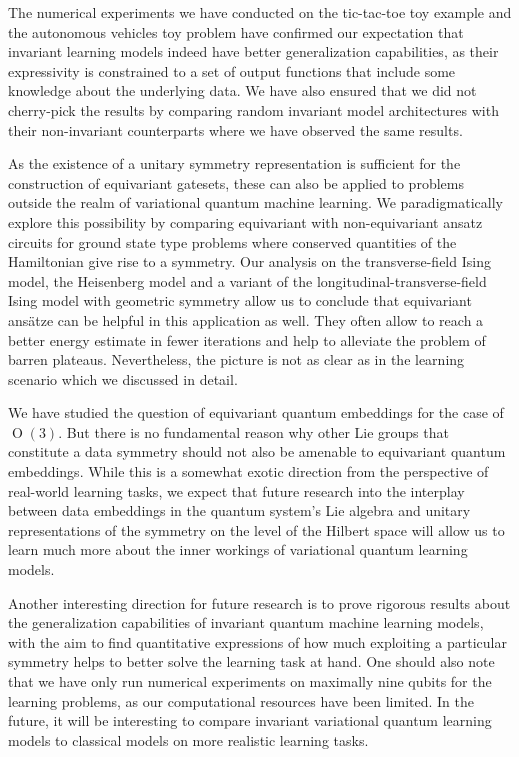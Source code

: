 \documentclass[a4paper,twocolumn,notitlepage,nofootinbib,superscriptaddress,floatfix]{revtex4-2}
\renewcommand{\O}{\ensuremath{\operatorname{O}}}
\begin{document}
The numerical experiments we have conducted on the tic-tac-toe toy example and the autonomous vehicles toy problem have confirmed our expectation that invariant learning models indeed have better generalization capabilities, as their expressivity is constrained to a set of output functions that include some knowledge about the underlying data. We have also ensured that we did not cherry-pick the results by comparing random invariant model architectures with their non-invariant counterparts where we have observed the same results.

As the existence of a unitary symmetry representation is sufficient for the construction of equivariant gatesets, these can also be applied to problems outside the realm of variational quantum machine learning. We paradigmatically explore this possibility by comparing equivariant with non-equivariant ansatz circuits for ground state type problems where conserved quantities of the Hamiltonian give rise to a symmetry. Our analysis on the transverse-field Ising model, the Heisenberg model and a variant of the longitudinal-transverse-field Ising model with geometric symmetry allow us to conclude that equivariant ansätze can be helpful in this application as well. They often allow to reach a better energy estimate in fewer iterations and help to alleviate the problem of barren plateaus. Nevertheless, the picture is not as clear as in the learning scenario which we discussed in detail.

We have studied the question of equivariant quantum embeddings for the case of $\O(3)$. But there is no fundamental reason why other Lie groups that constitute a data symmetry should not also be amenable to equivariant quantum embeddings. While this is a somewhat exotic direction from the perspective of real-world learning tasks, we expect that future research into the interplay between data embeddings in the quantum system's Lie algebra and unitary representations of the symmetry on the level of the Hilbert space will allow us to learn much more about the inner workings of variational quantum learning models.

Another interesting direction for future research is to prove rigorous results about the generalization capabilities of invariant quantum machine learning models, with the aim to find quantitative expressions of how much exploiting a particular symmetry helps to better solve the learning task at hand.
One should also note that we have only run numerical experiments on maximally nine qubits for the learning problems, as our computational resources have been limited. In the future, it will be interesting to compare invariant variational quantum learning models to classical models on more realistic learning tasks.
\end{document}
